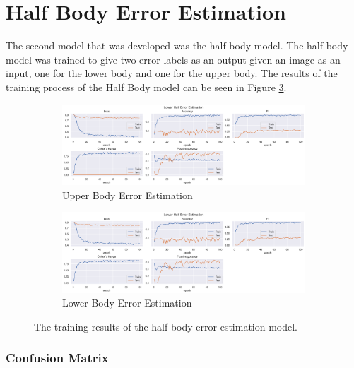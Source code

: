 \section{Half Body Error Estimation}
\label{sec:half_body}

The second model that was developed was the half body model. The half body model was trained to give two error labels as an output given an image as an input, one for the lower body and one for the upper body. The results of the training process of the Half Body model can be seen in Figure \ref{fig:half_body_training_results}.

\begin{figure}
  \centering
  \begin{subfigure}[b]{0.8\textwidth}
      \centering
      \includegraphics[width=\textwidth]{figures/Results/hb/HalfBodyErrorEstimation_uh.png}
      \caption{Upper Body Error Estimation}
      \label{fig:uh_ee}
  \end{subfigure}
  \hfill
  \begin{subfigure}[b]{0.8\textwidth}
      \centering
      \includegraphics[width=\textwidth]{figures/Results/hb/HalfBodyErrorEstimation_lh.png}
      \caption{Lower Body Error Estimation}
      \label{fig:lh_ee}
  \end{subfigure}
  \caption[Half Body model training results]{The training results of the half body error estimation model.}
     \label{fig:half_body_training_results}
\end{figure}

\subsubsection{Confusion Matrix}

